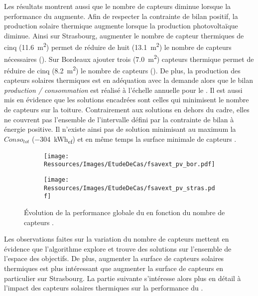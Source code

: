 Les résultats montrent aussi que le nombre de capteurs  diminue lorsque la
performance du  augmente. Afin de respecter la contrainte de bilan positif,
la production solaire thermique augmente lorsque la production photovoltaïque diminue.
Ainsi sur Strasbourg, augmenter le nombre de capteur thermiques de cinq (\SI{11.6}{m^{2}})
permet de réduire de huit (\SI{13.1}{m^{2}}) le nombre de capteurs  nécessaires
(). Sur Bordeaux ajouter trois (\SI{7.0}{m^{2}}) capteurs
thermique permet de réduire de cinq (\SI{8.2}{m^{2}}) le nombre de capteurs 
(). De plus, la production des capteurs solaires thermiques est en
adéquation avec la demande alors que le bilan \textit{production / consommation} est
réalisé à l’échelle annuelle pour le . Il est aussi mis en évidence que les
solutions encadrées sont celles qui minimisent le nombre de capteurs  sur la
toiture. Contrairement aux solutions en dehors du cadre, elles ne couvrent pas l’ensemble
de l’intervalle défini par la contrainte de bilan à énergie positive. Il n’existe ainsi
pas de solution minimisant au maximum la $Conso_{tot}$ (\SI{-304}{kWh_{ef}}) et en même
temps la surface minimale de capteurs .

\begin{figure}
    \centering
    \begin{subfigure}[b]{0.48\textwidth}
        \centering
        \texttt{[image: Ressources/Images/EtudeDeCas/fsavext\_pv\_bor.pdf]}
        \caption{}
        \label{fig:fsav_pv_bor}
    \end{subfigure}
    \quad
    \begin{subfigure}[b]{0.48\textwidth}
        \centering
        \texttt{[image: Ressources/Images/EtudeDeCas/fsavext\_pv\_stras.pdf]}
        \caption{}
        \label{fig:fsav_pv_stras}
    \end{subfigure}
    \caption[Évolution de la performance globale du  en fonction du nombre de capteurs ]
             {Évolution de la performance globale du  en fonction du nombre de capteurs .}
    \label{fig:fsav_pv_bor_stras}
\end{figure}

Les observations faites sur la variation du nombre de capteurs 
mettent en évidence que l’algorithme explore et trouve des solutions sur
l’ensemble de l’espace des objectifs. De plus, augmenter la surface de capteurs
solaires thermiques est plus intéressant que augmenter la surface de capteurs 
en particulier sur Strasbourg. La partie suivante s’intéresse alors plus en détail
à l’impact des capteurs solaires thermiques sur la performance du .

